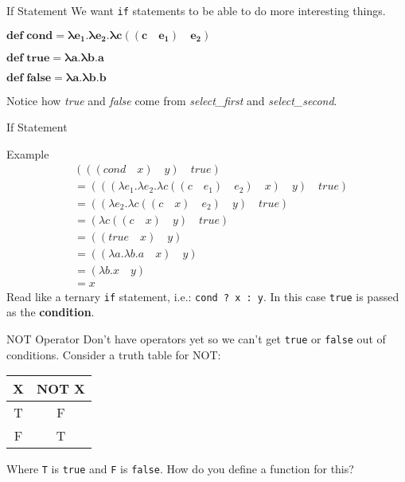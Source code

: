 \documentclass{beamer}
\begin{document}
\begin{frame}{If Statement}
We want \texttt{if} statements to be able to do more interesting things.
\begin{framed} $\mathbf{def \; cond = \lambda e_1 . \lambda e_2 . \lambda c ((c \quad e_1) \quad e_2)}$ \end{framed}
\begin{framed} $\mathbf{def \; true = \lambda a . \lambda b . a}$ \end{framed}
\begin{framed} $\mathbf{def \; false = \lambda a . \lambda b . b}$ \end{framed}
Notice how \textit{true} and \textit{false} come from \textit{select\_first} and \textit{select\_second}.
\end{frame}

\begin{frame}{If Statement}
\begin{block}{Example}
\begin{align*}
&(((cond \quad x) \quad y) \quad true) \\
  &= (((\lambda e_1 . \lambda e_2 . \lambda c ((c \quad e_1) \quad e_2) \quad x) \quad y) \quad true) \\
  &= ((\lambda e_2 . \lambda c ((c \quad x) \quad e_2) \quad y) \quad true) \\
  &= (\lambda c ((c \quad x) \quad y) \quad true) \\
  &= ((true \quad x) \quad y) \\
  &= ((\lambda a . \lambda b . a \quad x) \quad y) \\
  &= (\lambda b . x \quad y) \\
  &= x
\end{align*}
Read like a ternary \texttt{if} statement, i.e.: \texttt{cond ? x : y}. In this case \texttt{true} is passed as the \textbf{condition}.
\end{block}
\end{frame}

\begin{frame}{NOT Operator}
Don't have operators yet so we can't get \texttt{true} or \texttt{false} out of conditions. Consider a truth table for NOT:
\begin{table}
\centering
\begin{tabular}{c|c}
X & NOT X \\\hline
T & F \\
F & T
\end{tabular}
\end{table}
Where \texttt{T} is \texttt{true} and \texttt{F} is \texttt{false}. How do you define a function for this?
\end{frame}
\end{document}

